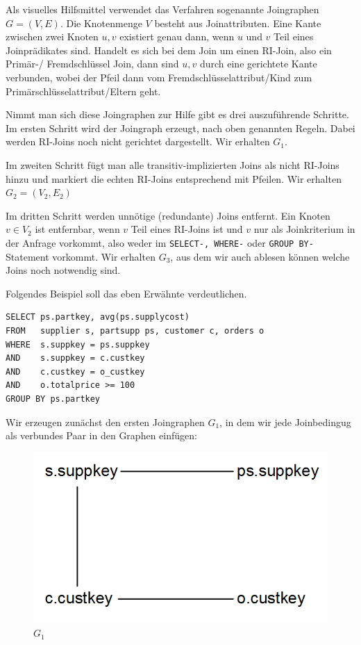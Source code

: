 Als visuelles Hilfsmittel verwendet das Verfahren sogenannte Joingraphen $G=(V,E)$. Die Knotenmenge $V$ besteht aus Joinattributen. Eine Kante zwischen zwei Knoten $u,v$ existiert genau dann, wenn $u$ und $v$ Teil eines Joinprädikates sind. Handelt es sich bei dem Join um einen RI-Join, also ein Primär-/ Fremdschlüssel Join, dann sind $u,v$ durch eine gerichtete Kante verbunden, wobei der Pfeil dann vom Fremdschlüsselattribut/Kind zum Primärschlüsselattribut/Eltern geht.

Nimmt man sich diese Joingraphen zur Hilfe gibt es drei auszuführende Schritte. Im ersten Schritt wird der Joingraph erzeugt, nach oben genannten Regeln. Dabei werden RI-Joins noch nicht gerichtet dargestellt. Wir erhalten $G_1$.

Im zweiten Schritt fügt man alle transitiv-implizierten Joins als nicht RI-Joins hinzu und markiert die echten RI-Joins entsprechend mit Pfeilen. Wir erhalten $G_2=(V_2,E_2)$

Im dritten Schritt werden unnötige (redundante) Joins entfernt. Ein Knoten $v\in V_2$ ist entfernbar, wenn $v$ Teil eines RI-Joins ist und $v$ nur als Joinkriterium in der Anfrage vorkommt, also weder im \verb|SELECT-, WHERE-| oder \verb|GROUP BY-|Statement vorkommt. Wir erhalten $G_3$, aus dem wir auch ablesen können welche Joins noch notwendig sind. 

Folgendes Beispiel soll das eben Erwähnte verdeutlichen.

\begin{lstlisting}[mathescape]
SELECT ps.partkey, avg(ps.supplycost)
FROM   supplier s, partsupp ps, customer c, orders o
WHERE  s.suppkey = ps.suppkey 
AND    s.suppkey = c.custkey
AND    c.custkey = o_custkey
AND    o.totalprice >= 100
GROUP BY ps.partkey
\end{lstlisting}

Wir erzeugen zunächst den ersten Joingraphen $G_1$, in dem wir jede Joinbedingug als verbundes Paar in den Graphen einfügen:

\begin{figure}[h]
\includegraphics[scale=0.4]{Bilder/joinelem_g1.png}
\caption{$G_1$}
\end{figure}

